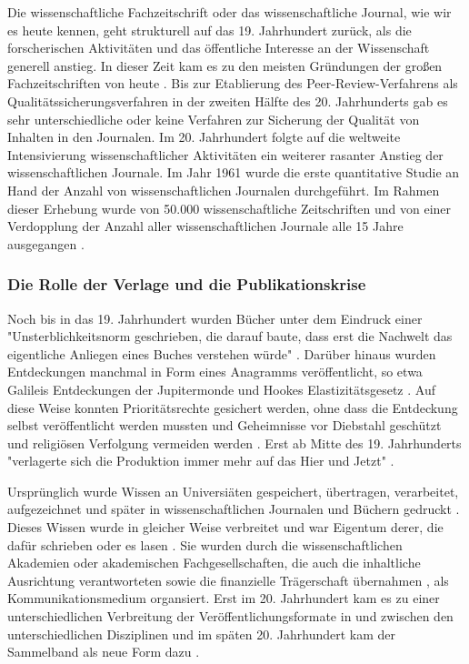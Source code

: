 Die wissenschaftliche Fachzeitschrift oder das wissenschaftliche Journal, wie wir es heute kennen, geht strukturell auf das 19. Jahrhundert zurück, als die forscherischen Aktivitäten und das öffentliche Interesse an der Wissenschaft generell anstieg. In dieser Zeit kam es zu den meisten Gründungen der großen Fachzeitschriften von heute \cite{porter_1964_scientific}. Bis zur Etablierung des Peer-Review-Verfahrens als Qualitätssicherungsverfahren in der zweiten Hälfte des 20. Jahrhunderts gab es sehr unterschiedliche oder keine Verfahren zur Sicherung der Qualität von Inhalten in den Journalen. Im 20. Jahrhundert folgte auf die weltweite Intensivierung wissenschaftlicher Aktivitäten ein weiterer rasanter Anstieg der wissenschaftlichen Journale. Im Jahr 1961 wurde die erste quantitative Studie an Hand der Anzahl von wissenschaftlichen Journalen durchgeführt. Im Rahmen dieser Erhebung wurde von 50.000 wissenschaftliche Zeitschriften und von einer Verdopplung der Anzahl aller wissenschaftlichen Journale alle 15 Jahre ausgegangen \cite{de_1982_little}.

\subsubsection{Die Rolle der Verlage und die Publikationskrise}

Noch bis in das 19. Jahrhundert wurden Bücher unter dem Eindruck einer "Unsterblichkeitsnorm geschrieben, die darauf baute, dass erst die Nachwelt das eigentliche Anliegen eines Buches verstehen würde" \cite{hagner_2015_sache_buches}. Darüber hinaus wurden Entdeckungen manchmal in Form eines Anagramms veröffentlicht, so etwa Galileis Entdeckungen der Jupitermonde \cite{miner2007discovery} und Hookes Elastizitätsgesetz \cite{szabo_2013_geschichte}. Auf diese Weise konnten Prioritätsrechte gesichert werden, ohne dass die Entdeckung selbst veröffentlicht werden mussten \cite{miner2007discovery} und Geheimnisse vor Diebstahl geschützt und religiösen Verfolgung vermeiden werden \cite{resnik_2005_ethics}. Erst ab Mitte des 19. Jahrhunderts "verlagerte sich die Produktion immer mehr auf das Hier und Jetzt" \cite{hagner_2015_sache_buches}.

Ursprünglich wurde Wissen an Universiäten gespeichert, übertragen, verarbeitet, aufgezeichnet und später in wissenschaftlichen Journalen und Büchern gedruckt \cite{kittler_2004}. Dieses Wissen wurde in gleicher Weise verbreitet \cite{hagner_2015_sache_buches} und war Eigentum derer, die dafür schrieben oder es lasen \cite{epaa_Weiner_2001}. Sie wurden durch die wissenschaftlichen Akademien oder akademischen Fachgesellschaften, die auch die inhaltliche Ausrichtung verantworteten sowie die finanzielle Trägerschaft übernahmen \cite{suchen}, als Kommunikationsmedium organsiert. Erst im 20. Jahrhundert kam es zu einer unterschiedlichen Verbreitung der Veröffentlichungsformate in und zwischen den unterschiedlichen Disziplinen und im späten 20. Jahrhundert kam der Sammelband als neue Form dazu \cite{hagner_2015_sache_buches}.

